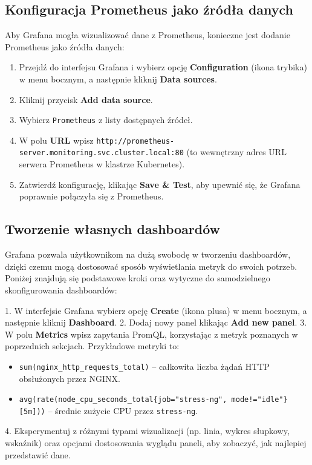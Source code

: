 \documentclass{article}
\begin{document}
\subsection{Konfiguracja Prometheus jako źródła danych}

Aby Grafana mogła wizualizować dane z Prometheus, konieczne jest dodanie Prometheus jako źródła danych:

\begin{enumerate}
    \item Przejdź do interfejsu Grafana i wybierz opcję \textbf{Configuration} (ikona trybika) w menu bocznym, a następnie kliknij \textbf{Data sources}.
    \item Kliknij przycisk \textbf{Add data source}.
    \item Wybierz \texttt{Prometheus} z listy dostępnych źródeł.
    \item W polu \textbf{URL} wpisz \texttt{http://prometheus-server.monitoring.svc.cluster.local:80} (to wewnętrzny adres URL serwera Prometheus w klastrze Kubernetes).
    \item Zatwierdź konfigurację, klikając \textbf{Save \& Test}, aby upewnić się, że Grafana poprawnie połączyła się z Prometheus.
\end{enumerate}

\subsection{Tworzenie własnych dashboardów}

Grafana pozwala użytkownikom na dużą swobodę w tworzeniu dashboardów, dzięki czemu mogą dostosować sposób wyświetlania metryk do swoich potrzeb. Poniżej znajdują się podstawowe kroki oraz wytyczne do samodzielnego skonfigurowania dashboardów:

1. W interfejsie Grafana wybierz opcję \textbf{Create} (ikona plusa) w menu bocznym, a następnie kliknij \textbf{Dashboard}.
2. Dodaj nowy panel klikając \textbf{Add new panel}.
3. W polu \textbf{Metrics} wpisz zapytania PromQL, korzystając z metryk poznanych w poprzednich sekcjach. Przykładowe metryki to:
\begin{itemize}
\item \texttt{sum(nginx\_http\_requests\_total)} – całkowita liczba żądań HTTP obsłużonych przez NGINX.
\item \texttt{avg(rate(node\_cpu\_seconds\_total\{job="stress-ng", mode!="idle"\}[5m]))} – średnie zużycie CPU przez \texttt{stress-ng}.
\end{itemize}
4. Eksperymentuj z różnymi typami wizualizacji (np. linia, wykres słupkowy, wskaźnik) oraz opcjami dostosowania wyglądu paneli, aby zobaczyć, jak najlepiej przedstawić dane.
\end{document}
